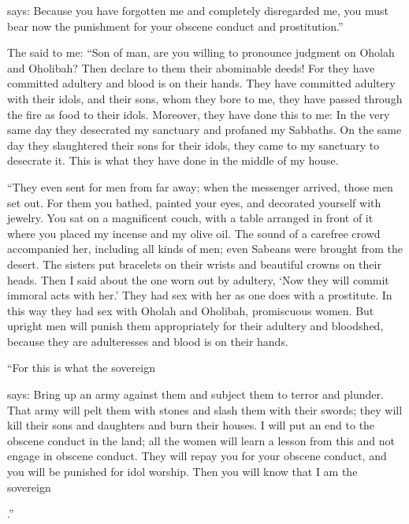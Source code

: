 {{}
says: Because
you have forgotten
me and completely disregarded
me, you
must bear
now the punishment for your obscene conduct
and prostitution.”
\par }{\PP {}The
{}
said
to
me: “Son
of man,
are you willing
to pronounce
judgment on Oholah
and Oholibah? Then declare
to them their abominable deeds!
For
they have committed adultery
and blood
is on their hands.
They have committed adultery
with
their idols,
and their
sons,
whom
they bore
to me, they have passed
through the fire as food to their idols.
Moreover,
they have done
this
to me: In the very same day
they desecrated
my sanctuary
and profaned
my Sabbaths.
On the same
day
they slaughtered
their sons
for their idols,
they came
to
my sanctuary
to desecrate
it. This is what
they have done
in the middle
of my house.
\par }{\PP {}“They even
sent
for
men
from far away;
when the messenger
arrived,
those men set out.
For
them you bathed,
painted
your eyes,
and decorated yourself
with jewelry.
You sat
on
a magnificent
couch,
with a table
arranged
in front
of it where you placed
my incense
and my olive oil.
The sound
of a carefree
crowd
accompanied her, including all kinds of men;
even Sabeans
were brought
from the desert.
The sisters put
bracelets
on
their wrists
and beautiful
crowns
on
their heads.
Then I said
about the one worn out
by adultery,
‘Now they will commit
immoral acts
with her.’
They had sex
with
her
as one does with a prostitute.
In this way
they had sex
with
Oholah
and Oholibah,
promiscuous
women.
But
upright men
will punish them
appropriately
for their adultery
and bloodshed,
because
they are adulteresses
and blood
is on their hands.
\par }{\PP {}“For
this is what
the sovereign

{}
says: Bring up
an army against
them and subject
them to terror
and plunder.
That army will pelt
them with stones
and slash them
with their swords;
they will kill
their sons
and daughters
and burn
their houses.
I will put an end
to the obscene
conduct
in the land;
all
the women
will learn a lesson from
this and not
engage
in obscene
conduct.
They will repay
you for your obscene
conduct, and you will be punished
for idol
worship. Then
you will know
that
I am
the sovereign

{}.”

\par }
